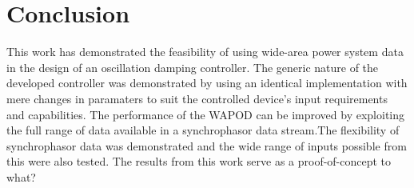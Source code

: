 \documentclass[journal]{IEEEtran}
\begin{document}
\section{Conclusion}\label{Conclusion}
This work has demonstrated the feasibility of using wide-area power system data in the design of an oscillation damping controller. The generic nature of the developed controller was demonstrated by using an identical implementation with mere changes in paramaters to suit the controlled device's input requirements and capabilities. The performance of the WAPOD can be improved by exploiting the full range of data available in a synchrophasor data stream.The flexibility of synchrophasor data was demonstrated and the wide range of inputs possible from this were also tested. The results from this work serve as a proof-of-concept to what?






%
\end{document}
